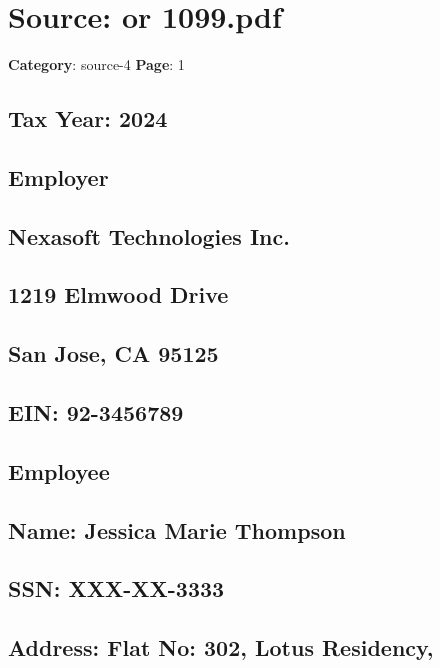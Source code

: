 \section*{Source: or 1099.pdf}
\textbf{Category}: source-4
\textbf{Page}: 1

\subsection*{Tax Year: 2024}

\subsection*{Employer}

\subsection*{Nexasoft Technologies Inc.}

\subsection*{1219 Elmwood Drive}

\subsection*{San Jose, CA 95125}

\subsection*{EIN: 92-3456789}

\subsection*{Employee}

\subsection*{Name: Jessica Marie Thompson}

\subsection*{SSN: XXX-XX-3333}

\subsection*{Address: Flat No: 302, Lotus Residency,}

